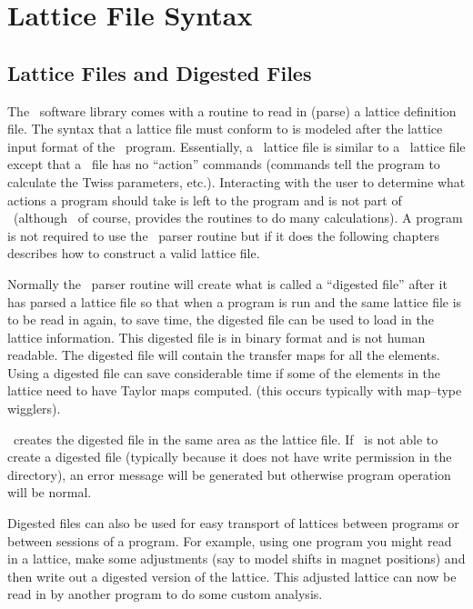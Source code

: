 \chapter{Lattice File Syntax}

\section{Lattice Files and Digested Files}

The \bmad\ software library comes with a routine to read in (parse) a
lattice definition file. The syntax that a lattice file must conform to is
modeled after the lattice input format of the \mad\ program.
Essentially, a \bmad\ lattice file is similar to a \mad\ lattice file except that
a \bmad\ file has no ``action'' commands (commands tell the program
to calculate the
Twiss parameters, etc.). Interacting with the user to determine what
actions a program should take is left to the program and is not part of
\bmad\ (although \bmad\, of course, provides the routines to do many
calculations). A program is not required to use the \bmad\
parser routine but if it does the following chapters describes how to
construct a valid lattice file.

Normally the \bmad\ parser routine will create what is called a
``digested file'' after it has parsed a lattice file so that when a
program is run and the same lattice file is to be read in again, to save
time, the digested file can be used to load in the lattice information.
This digested file is in binary format and is not human readable. The
digested file will contain the transfer maps for all the elements. 
Using a digested file can save considerable time if some of the
elements in the lattice need to have Taylor maps computed.
(this occurs typically with map--type wigglers).

\bmad\ creates the digested file in the same area as the lattice file.
If \bmad\ is not able to create a digested file (typically because it
does not have write permission in the directory), an error message will
be generated but otherwise program operation will be normal.

Digested files can also be used for easy transport of lattices between
programs or between sessions of a program. For example, using one
program you might read in a lattice, make some adjustments (say to model
shifts in magnet positions) and then write out a digested version of the
lattice. This adjusted lattice can now be read in by another program to
do some custom analysis.

